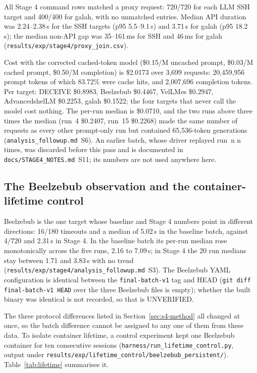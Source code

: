 \documentclass[a4paper,11pt]{article}
\begin{document}
All Stage 4 command rows matched a proxy request: 720/720 for each LLM SSH
target and 400/400 for galah, with no unmatched entries. Median API duration was
2.24--2.38\,s for the SSH targets (p95 5.5--9.1\,s) and 3.71\,s for galah (p95
18.2\,s); the median non-API gap was 35--161\,ms for SSH and 46\,ms for galah
(\texttt{results/exp/stage4/proxy\_join.csv}).

Cost with the corrected cached-token model (\$0.15/M uncached prompt, \$0.03/M
cached prompt, \$0.50/M completion) is \$2.0173 over 3,699 requests: 20,459,956
prompt tokens of which 83.72\% were cache hits, and 2,007,696 completion
tokens. Per target: DECEIVE \$0.8983, Beelzebub \$0.4467, VelLMes \$0.2947,
AdvancedshelLM \$0.2253, galah \$0.1522; the four targets that never call the
model cost nothing. The per-run median is \$0.0710, and the two runs above
three times the median (run~4 \$0.2407, run~15 \$0.2268) made the same number of
requests as every other prompt-only run but contained 65,536-token generations
(\texttt{analysis\_followup.md}~S6). An earlier batch, whose driver replayed
run~n n times, was discarded before this pass and is documented in
\texttt{docs/STAGE4\_NOTES.md}~S11; its numbers are not used anywhere here.

\subsection{The Beelzebub observation and the container-lifetime control}
\label{sec:lifetime}

Beelzebub is the one target whose baseline and Stage 4 numbers point in
different directions: 16/180 timeouts and a median of 5.02\,s in the baseline
batch, against 4/720 and 2.31\,s in Stage 4. In the baseline batch its per-run
median rose monotonically across the five runs, 2.16 to 7.09\,s; in Stage 4 the
20 run medians stay between 1.71 and 3.83\,s with no trend
(\texttt{results/exp/stage4/analysis\_followup.md}~S3). The Beelzebub YAML
configuration is identical between the \texttt{final-batch-v1} tag and HEAD
(\texttt{git diff final-batch-v1 HEAD} over the three Beelzebub files is empty);
whether the built binary was identical is not recorded, so that is UNVERIFIED.

The three protocol differences listed in Section~\ref{sec:s4-method} all
changed at once, so the batch difference cannot be assigned to any one of them
from these data. To isolate container lifetime, a control experiment kept one
Beelzebub container for ten consecutive sessions
(\texttt{harness/run\_lifetime\_control.py}, output under
\texttt{results/exp/lifetime\_control/\allowbreak{}beelzebub\_persistent/}).
Table~\ref{tab:lifetime} summarises it.
\end{document}
